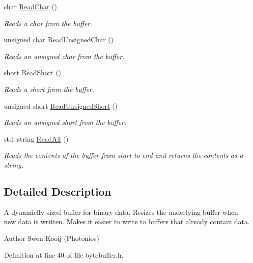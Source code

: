 \begin{DoxyCompactItemize}
char \hyperlink{class_senergy_1_1_byte_buffer_a806db1b33ff86b572a0804879d181dc8}{Read\-Char} ()
\begin{DoxyCompactList}\small\item\em Reads a char from the buffer. \end{DoxyCompactList}\item 
unsigned char \hyperlink{class_senergy_1_1_byte_buffer_ad9a7a05b0285fe070cde3983458de5f6}{Read\-Unsigned\-Char} ()
\begin{DoxyCompactList}\small\item\em Reads an unsigned char from the buffer. \end{DoxyCompactList}\item 
short \hyperlink{class_senergy_1_1_byte_buffer_a989443842e20c2feba4268e968911fe8}{Read\-Short} ()
\begin{DoxyCompactList}\small\item\em Reads a short from the buffer. \end{DoxyCompactList}\item 
unsigned short \hyperlink{class_senergy_1_1_byte_buffer_aa6b6bfdb398a75b92c79bcdfc1986821}{Read\-Unsigned\-Short} ()
\begin{DoxyCompactList}\small\item\em Reads an unsigned short from the buffer. \end{DoxyCompactList}\item 
std\-::string \hyperlink{class_senergy_1_1_byte_buffer_a5c3f960422533abc898061be11b6f613}{Read\-All} ()
\begin{DoxyCompactList}\small\item\em Reads the contents of the buffer from start to end and returns the contents as a string. \end{DoxyCompactList}\end{DoxyCompactItemize}


\subsection{Detailed Description}
A dynamiclly sized buffer for binary data. Resizes the underlying buffer when new data is written. Makes it easier to write to buffers that already contain data. 

\begin{DoxyAuthor}{Author}
Swen Kooij (Photonios) 
\end{DoxyAuthor}


Definition at line 40 of file bytebuffer.\-h.



